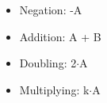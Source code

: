 \begin{itemize}
  \item Negation: -A
  \item Addition: A + B
  \item Doubling: 2$\cdot$A
  \item Multiplying: k$\cdot$A
\end{itemize}
